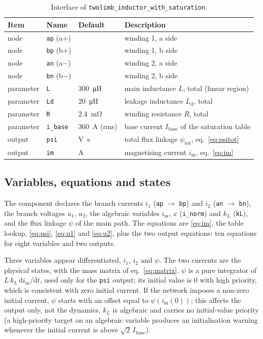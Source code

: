\documentclass[11pt,a4paper]{article}
\begin{document}
\begin{table}[htbp]
\centering
\caption{Interface of \texttt{twolimb\_inductor\_with\_saturation}.}
\label{tab:if}
\begin{tabular}{@{}llll@{}}
\toprule
Item & Name & Default & Description \\
\midrule
node & \texttt{ap} (a$+$) & & winding 1, a side \\
node & \texttt{bp} (b$+$) & & winding 1, b side \\
node & \texttt{an} (a$-$) & & winding 2, a side \\
node & \texttt{bn} (b$-$) & & winding 2, b side \\
\midrule
parameter & \texttt{L} & \SI{300}{\micro\henry} & main inductance $L$, total (linear region) \\
parameter & \texttt{Ld} & \SI{20}{\micro\henry} & leakage inductance $L_\mathrm{d}$, total \\
parameter & \texttt{R} & \SI{2.4}{\milli\ohm} & winding resistance $R$, total \\
parameter & \texttt{i\_base} & \SI{360}{\ampere} (rms) & base current $I_\mathrm{base}$ of the saturation table \\
\midrule
output & \texttt{psi} & \si{\volt\second} & total flux linkage $\psi_\mathrm{tot}$, eq.~\eqref{eq:psitot} \\
output & \texttt{im} & \si{\ampere} & magnetising current $i_\mathrm{m}$, eq.~\eqref{eq:im} \\
\bottomrule
\end{tabular}
\end{table}

\subsection{Variables, equations and states}

The component declares the branch currents $i_1$ (\texttt{ap} $\to$ \texttt{bp}) and
$i_2$ (\texttt{an} $\to$ \texttt{bn}), the branch voltages $u_1$, $u_2$, the algebraic
variables $i_\mathrm{m}$, $x$ (\texttt{i\_norm}) and $k_L$ (\texttt{kL}), and the flux
linkage $\psi$ of the main path. The equations are \eqref{eq:im}, the table lookup,
\eqref{eq:psi}, \eqref{eq:u1} and \eqref{eq:u2}, plus the two output equations: ten
equations for eight variables and two outputs.

Three variables appear differentiated, $i_1$, $i_2$ and $\psi$. The two currents are the
physical states, with the mass matrix of eq.~\eqref{eq:matrix}. $\psi$ is a pure
integrator of $L\,k_L\,\mathrm{d}i_\mathrm{m}/\mathrm{d}t$, used only for the
\texttt{psi} output; its initial value is $0$ with high priority, which is consistent
with zero initial current. If the network imposes a non-zero initial current, $\psi$
starts with an offset equal to $\psi(i_\mathrm{m}(0))$; this affects the output only, not
the dynamics. $k_L$ is algebraic and carries no initial-value priority (a high-priority
target on an algebraic variable produces an initialisation warning whenever the initial
current is above $\sqrt{2}\,I_\mathrm{base}$).
\end{document}
